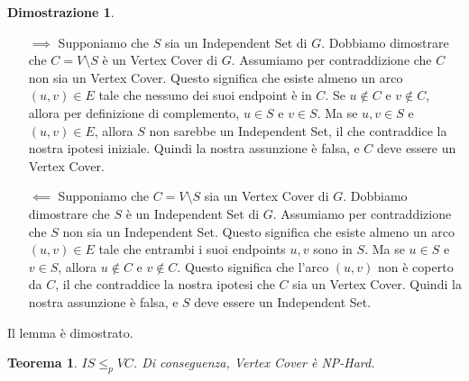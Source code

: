 \documentclass[a4paper]{article}
\newtheorem{theorem}{Teorema}[section]
\theoremstyle{definition} %
\newtheorem*{proof*}{Dimostrazione}
\begin{document}
\begin{proof*}
\begin{itemize}
    \item[$\implies$] Supponiamo che $S$ sia un Independent Set di $G$.
    Dobbiamo dimostrare che $C = V \setminus S$ è un Vertex Cover di $G$.
    Assumiamo per contraddizione che $C$ non sia un Vertex Cover. Questo significa che esiste almeno un arco $(u, v) \in E$ tale che nessuno dei suoi endpoint è in $C$. Se $u \notin C$ e $v \notin C$, allora per definizione di complemento, $u \in S$ e $v \in S$. Ma se $u, v \in S$ e $(u, v) \in E$, allora $S$ non sarebbe un Independent Set, il che contraddice la nostra ipotesi iniziale. Quindi la nostra assunzione è falsa, e $C$ deve essere un Vertex Cover.

    \item[$\impliedby$] Supponiamo che $C = V \setminus S$ sia un Vertex Cover di $G$.
    Dobbiamo dimostrare che $S$ è un Independent Set di $G$.
    Assumiamo per contraddizione che $S$ non sia un Independent Set. Questo significa che esiste almeno un arco $(u, v) \in E$ tale che entrambi i suoi endpoints $u, v$ sono in $S$. Ma se $u \in S$ e $v \in S$, allora $u \notin C$ e $v \notin C$. Questo significa che l'arco $(u, v)$ non è coperto da $C$, il che contraddice la nostra ipotesi che $C$ sia un Vertex Cover. Quindi la nostra assunzione è falsa, e $S$ deve essere un Independent Set.
\end{itemize}
Il lemma è dimostrato.
\end{proof*}

\begin{theorem}
$IS \le_p VC$. Di conseguenza, \emph{Vertex Cover} è NP-Hard.
\end{theorem}
\end{document}
